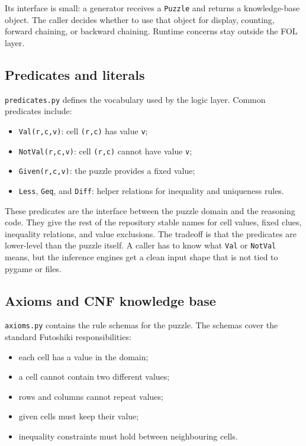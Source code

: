 \documentclass[11pt]{article}
\begin{document}
Its interface is small: a generator receives a \texttt{Puzzle} and returns a
knowledge-base object. The caller decides whether to use that object for
display, counting, forward chaining, or backward chaining. Runtime concerns
stay outside the FOL layer.

\subsection{Predicates and literals}

\texttt{predicates.py} defines the vocabulary used by the logic layer. Common
predicates include:

\begin{itemize}
  \item \texttt{Val(r,c,v)}: cell \texttt{(r,c)} has value \texttt{v};
  \item \texttt{NotVal(r,c,v)}: cell \texttt{(r,c)} cannot have value
        \texttt{v};
  \item \texttt{Given(r,c,v)}: the puzzle provides a fixed value;
  \item \texttt{Less}, \texttt{Geq}, and \texttt{Diff}: helper relations for
        inequality and uniqueness rules.
\end{itemize}

These predicates are the interface between the puzzle domain and the reasoning
code. They give the rest of the repository stable names for cell values, fixed
clues, inequality relations, and value exclusions. The tradeoff is that the
predicates are lower-level than the puzzle itself. A caller has to know what
\texttt{Val} or \texttt{NotVal} means, but the inference engines get a clean
input shape that is not tied to pygame or files.

\subsection{Axioms and CNF knowledge base}

\texttt{axioms.py} contains the rule schemas for the puzzle. The schemas cover
the standard Futoshiki responsibilities:

\begin{itemize}
  \item each cell has a value in the domain;
  \item a cell cannot contain two different values;
  \item rows and columns cannot repeat values;
  \item given cells must keep their value;
  \item inequality constraints must hold between neighbouring cells.
\end{itemize}
\end{document}
